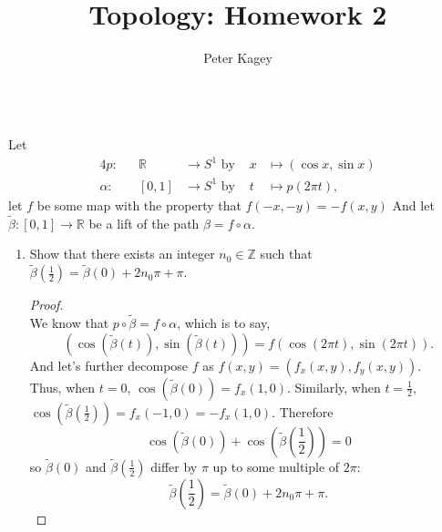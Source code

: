 \documentclass{article}
\newenvironment{problem}[2][Problem]{\begin{trivlist}
\item[\hskip \labelsep {\bfseries #1}\hskip \labelsep {\bfseries #2.}]}{\end{trivlist}}
\begin{document}
\title{Topology: Homework 2}
\author{Peter Kagey}

\maketitle

\begin{problem}{1} \text{} \\
  Let \begin{alignat*}{4}
    p      \colon&&\mathbb R &\rightarrow S^1 \text{ by }& x      &\mapsto (\cos x, \sin x) \\
    \alpha \colon&& [0, 1]   &\rightarrow S^1 \text{ by }& t      &\mapsto p(2\pi t),
  \end{alignat*}
  let $f$ be some map with the property that $f(-x, -y) = -f(x, y)$
  And let $\widetilde\beta\colon [0, 1] \rightarrow \mathbb R$ be a lift of the
  path $\beta = f \circ \alpha$.
  \begin{enumerate}[label=\textbf{\alph*.}]
    \item Show that there exists an integer $n_0 \in \mathbb Z$ such that
    $\widetilde\beta(\frac{1}{2}) = \widetilde\beta(0) + 2n_0\pi + \pi$.
      \begin{proof} \text{} \\
        We know that $p \circ \widetilde\beta = f \circ \alpha$, which is to
        say, \[
          (\cos(\widetilde\beta(t)), \sin(\widetilde\beta(t))) = f(\cos(2\pi t), \sin(2\pi t)).
        \]
        And let's further decompose $f$ as $f(x, y) = (f_x(x,y), f_y(x,y))$.
        \\
        Thus, when $t = 0$, $\cos(\widetilde\beta(0)) = f_x(1, 0)$.
        Similarly, when $t = \frac{1}{2}$,
        $\cos(\widetilde\beta(\frac{1}{2})) = f_x(-1, 0) = -f_x(1, 0)$.
        Therefore \[
          \cos(\widetilde\beta(0)) +
          \cos(\widetilde\beta(\textstyle\frac{1}{2})) = 0
        \] so $\widetilde\beta(0)$ and $\widetilde\beta(\frac{1}{2})$ differ by
        $\pi$ up to some multiple of $2\pi$:
        \[
          \widetilde\beta(\textstyle{\frac{1}{2}})
          = \widetilde\beta(0) + 2n_0\pi + \pi.
        \]
      \end{proof}

\end{enumerate}
\end{problem}
\end{document}
